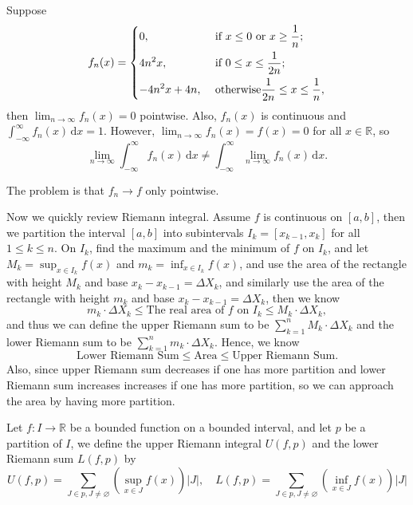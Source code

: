 \begin{eg}
    Suppose 
    \[
        f_n(x) = \begin{dcases}
            0, &\text{ if } x \le 0 \text{ or } x \ge \frac{1}{n}  ;\\
            4n^2 x, &\text{ if } 0 \le x \le \frac{1}{2n}  ;\\
            -4 n^2 x + 4n, &\text{ otherwise} \frac{1}{2n} \le x \le \frac{1}{n},
        \end{dcases}
    \]
    then \(\lim_{n \to \infty} f_n(x) = 0 \) pointwise. Also, \(f_n(x)\) is continuous and \(\int _{-\infty }^{\infty } f_n(x) \, \mathrm{d} x = 1 \). However, \(\lim_{n \to \infty} f_n(x) = f(x) = 0 \) for all \(x \in \mathbb{R} \), so 
    \[
        \lim_{n \to \infty} \int_{-\infty }^{\infty } f_n(x) \, \mathrm{d} x \neq \int _{-\infty }^{\infty } \lim_{n \to \infty} f_n(x) \, \mathrm{d} x.    
    \]     
\end{eg}

\begin{note}
    The problem is that \(f_n \to f\) only pointwise. 
\end{note}

Now we quickly review Riemann integral. Assume \(f\) is continuous on \([a, b]\), then we partition the interval \([a, b]\) into subintervals \(I_k = [x_{k-1}, x_k]\) for all \(1 \le k \le n \). On \(I_k\), find the maximum and the minimum of \(f\) on \(I_k\), and let \(M_k = \sup _{x \in I_k} f(x)\) and \(m_k = \inf _{x \in I_k} f(x)\), and use the area of the rectangle with height \(M_k\) and base \(x_k - x_{k-1} = \Delta X_k\), and similarly use the area of the rectangle with height \(m_k\) and base \(x_k - x_{k-1} = \Delta X_k\), then we know 
\[
    m_k \cdot \Delta X_k \le \text{The real area of } f \text{ on } I_k \le M_k \cdot \Delta X_k,  
\] and thus we can define the upper Riemann sum to be \(\sum_{k=1}^n M_k \cdot \Delta X_k \) and the lower Riemann sum to be \(\sum_{k=1}^n m_k \cdot \Delta X_k \). Hence, we know 
\[
    \text{Lower Riemann Sum} \le \text{Area} \le \text{Upper Riemann Sum}.   
\] Also, since upper Riemann sum decreases if one has more partition and lower Riemann sum increases increases if one has more partition, so we can approach the area by having more partition.

\begin{definition} \label{def: upper/lower riemann integral}
    Let \(f: I \to \mathbb{R} \) be a bounded function on a bounded interval, and let \(p\) be a partition of \(I\), we define the upper Riemann integral \(U(f, p)\) and the lower Riemann sum \(L(f, p)\) by 
    \[
        U(f, p) = \sum_{J \in p, J \neq \varnothing } \left( \sup _{x \in J} f(x) \right) \vert J \vert, \quad L(f, p) = \sum_{J \in p, J \neq \varnothing } \left( \inf _{x \in J} f(x) \right) \vert J \vert 
    \]    
\end{definition}

